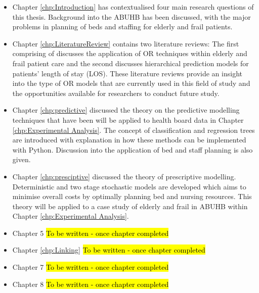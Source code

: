 \documentclass[../thesis.tex]{subfiles}
\begin{document}
\begin{itemize}
\item Chapter \ref{chp:Introduction} has contextualised four main research questions of this thesis. Background into the ABUHB has been discussed, with the major problems in planning of beds and staffing for elderly and frail patients.
    \item Chapter \ref{chp:LiteratureReview} contains two literature reviews: The first comprising of \cite{Williams} discusses the application of OR techniques within elderly and frail patient care and the second discusses hierarchical prediction models for patients' length of stay (LOS). These literature reviews provide an insight into the type of OR models that are currently used in this field of study and the opportunities available for researchers to conduct future study.
    
    \item Chapter \ref{chp:predictive} discussed the theory on the predictive modelling techniques that have been will be applied to health board data in Chapter \ref{chp:Experimental Analysis}. The concept of classification and regression trees are introduced with explanation in how these methods can be implemented with Python. Discussion into the application of bed and staff planning is also given.
    
    \item Chapter \ref{chp:presciptive} discussed the theory of prescriptive modelling. Deterministic and two stage stochastic models are developed which aims to minimise overall costs by optimally planning bed and nursing resources. This theory will be applied to a case study of elderly and frail in ABUHB within Chapter \ref{chp:Experimental Analysis}.

    
    \item Chapter 5 \hl{To be written - once chapter completed}    
    \item Chapter \ref{chp:Linking} \hl{To be written - once chapter completed}
    \item Chapter 7 \hl{To be written - once chapter completed}
    \item Chapter 8 \hl{To be written - once chapter completed}
    
\end{itemize}
\end{document}
